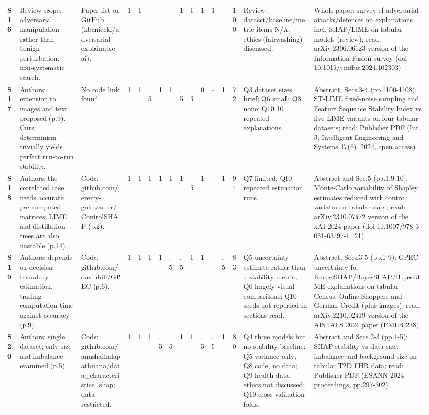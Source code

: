 \begin{longtable}{@{}P{1.0cm}P{4.6cm}P{3.6cm}P{0.3cm}P{0.3cm}P{0.3cm}P{0.3cm}P{0.3cm}P{0.3cm}P{0.3cm}P{0.3cm}P{0.3cm}P{0.36cm}P{0.75cm}P{3.0cm}P{3.9cm}@{}}
\textbf{S16} & Review scope: adversarial manipulation rather than benign perturbation; non-systematic search. & Paper list on GitHub (hbaniecki/\allowbreak{}adversarial-explainable-ai). & 1 & 1 & -- & -- & -- & 1 & 1 & 1 & 1 & -- & 100 & Review: dataset/\allowbreak{}baseline/\allowbreak{}metric items N/\allowbreak{}A; ethics (fairwashing) discussed. & Whole paper: survey of adversarial attacks/\allowbreak{}defences on explanations incl. SHAP/\allowbreak{}LIME on tabular models (review); read: arXiv:2306.06123 version of the Information Fusion survey (doi 10.1016/\allowbreak{}j.inffus.2024.102303) \\
\textbf{S17} & Authors: extension to images and text proposed (p.9). Ours: determinism trivially yields perfect run-to-run stability. & No code link found. & 1 & 1 & .5 & 1 & 1 & .5 & .5 & 0 & -- & 1 & 72 & Q3 dataset sizes brief; Q6 small; Q8 none; Q10 10 repeated explanations. & Abstract, Secs.3-4 (pp.1100-1108): ST-LIME fixed-noise sampling and Feature Sequence Stability Index vs five LIME variants on four tabular datasets; read: Publisher PDF (Int. J. Intelligent Engineering and Systems 17(6), 2024, open access) \\
\textbf{S18} & Authors: the correlated case needs accurate pre-computed matrices; LIME and distillation trees are also unstable (p.14). & Code: github.com/\allowbreak{}jeremy-goldwasser/\allowbreak{}ControlSHAP (p.2). & 1 & 1 & 1 & 1 & 1 & 1 & .5 & 1 & -- & 1 & 94 & Q7 limited; Q10 repeated estimation runs. & Abstract and Sec.5 (pp.1,9-10): Monte-Carlo variability of Shapley estimates reduced with control variates on tabular data; read: arXiv:2310.07672 version of the xAI 2024 paper (doi 10.1007/\allowbreak{}978-3-031-63797-1\_\allowbreak{}21) \\
\textbf{S19} & Authors: depends on decision-boundary estimation, trading computation time against accuracy (p.9). & Code: github.com/\allowbreak{}davinhill/\allowbreak{}GPEC (p.6). & 1 & 1 & 1 & 1 & .5 & .5 & 1 & 1 & -- & .5 & 83 & Q5 uncertainty estimate rather than a stability metric; Q6 largely visual comparisons; Q10 seeds not reported in sections read. & Abstract, Secs.3-5 (pp.1-9): GPEC uncertainty for KernelSHAP/\allowbreak{}BayesSHAP/\allowbreak{}BayesLIME explanations on tabular Census, Online Shoppers and German Credit (plus images); read: arXiv:2210.02419 version of the AISTATS 2024 paper (PMLR 238) \\
\textbf{S20} & Authors: single dataset; only size and imbalance examined (p.5). & Code: github.com/\allowbreak{}anushaihalapathirana/\allowbreak{}data\_\allowbreak{}characteristics\_\allowbreak{}shap; data restricted. & 1 & 1 & 1 & .5 & .5 & 1 & 1 & .5 & .5 & 1 & 80 & Q4 three models but no stability baseline; Q5 variance only; Q8 code, no data; Q9 health data, ethics not discussed; Q10 cross-validation folds. & Abstract and Secs.2-3 (pp.1-5): SHAP stability vs data size, imbalance and background size on tabular T2D EHR data; read: Publisher PDF (ESANN 2024 proceedings, pp.297-302) \\

\end{longtable}
